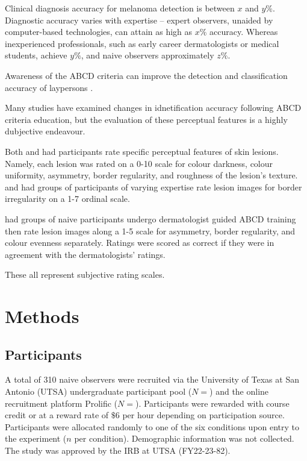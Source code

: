 \documentclass[a4paper, natbib, doc, 12pt]{apa7}
\begin{document}
Clinical diagnosis accuracy for melanoma detection is between $x$ and $y\%$. Diagnostic accuracy varies with expertise -- expert observers, unaided by computer-based technologies, can attain as high as $x\%$ accuracy. Whereas inexperienced professionals, such as early career dermatologists or medical students, achieve $y\%$, and naive observers approximately $z\%$. 


Awareness of the ABCD criteria can improve the detection and classification accuracy of laypersons \citep{robinson2006skills}.

Many studies have examined changes in idnetification accuracy following ABCD criteria education, but the evaluation of these perceptual features is a highly dubjective endeavour. 

Both \cite{zanotto2011visual} and \cite{laskaris2010fuzzy} had participants rate specific perceptual features of skin lesions. Namely, each lesion was rated on a 0-10 scale for colour darkness, colour uniformity, asymmetry, border regularity, and roughness of the lesion's texture. \cite{gunasti2008interrater} and \cite{} had groups of participants of varying expertise rate lesion images for border irregularity on a 1-7 ordinal scale. 

\cite{robinson2006skills} had groups of naive participants undergo dermatologist guided ABCD training then rate lesion images along a 1-5 scale for asymmetry, border regularity, and colour evenness separately. Ratings were scored as correct if they were in agreement with the dermatologists' ratings.


These all represent subjective rating scales.

\section{Methods}
\subsection{Participants}
A total of 310 naive observers were recruited via the University of Texas at San Antonio (UTSA) undergraduate participant pool ($N= $) and the online recruitment platform Prolific ($N= $). Participants were rewarded with course credit or at a reward rate of $\$6$ per hour depending on participation source. Participants were allocated randomly to one of the six conditions upon entry to the experiment ($n$ per condition). Demographic information was not collected. The study was approved by the IRB at UTSA (FY22-23-82). 
\end{document}

